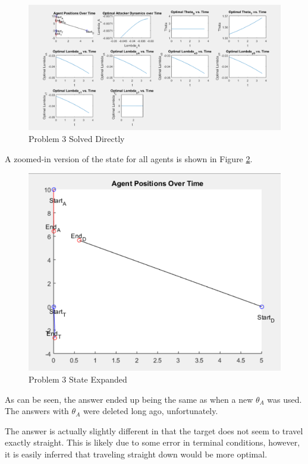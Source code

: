 \documentclass[12pt,letterpaper]{article}
\begin{document}
\begin{figure}[!h]
\centering
\includegraphics[width=6in]{prob3indirect.png}
\caption{Problem 3 Solved Directly}
\label{fig:prob3indirect}
\end{figure}

A zoomed-in version of the state for all agents is shown in Figure \ref{fig:prob3zoom}.


\clearpage


\begin{figure}[!h]
\centering
\includegraphics[width=5in]{prob3zoom.png}
\caption{Problem 3 State Expanded}
\label{fig:prob3zoom}
\end{figure}

As can be seen, the answer ended up being the same as when a new $\theta_A$ was used. The answers with $\theta_A$ were deleted long ago, unfortunately. 

The answer is actually slightly different in that the target does not seem to travel exactly straight. This is likely due to some error in terminal conditions, however, it is easily inferred that traveling straight down would be more optimal.
\end{document}
